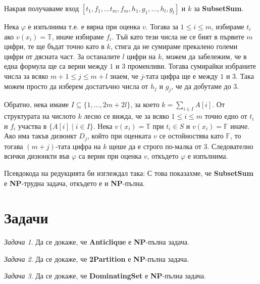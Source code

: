 \documentclass{article}
\newcommand{\T}{\mathbb{T}}
\newcommand{\F}{\mathbb{F}}
\newcommand{\NP}{\textbf{NP}}
\theoremstyle{definition}
\theoremstyle{plain}
\theoremstyle{remark}
\newtheorem{problem}{Задача}
\theoremstyle{definition}
\begin{document}
Накрая получаваме вход $[t_1, f_1, \dots t_m, f_m, h_1, g_1, \dots, h_l, g_l]$ и $k$ за \textbf{SubsetSum}.

Нека $\varphi$ е изпълнима т.е. е вярна при оценка $v$.
Тогава за $1 \leq i \leq m$, избираме $t_i$ ако $v(x_i) = \T$, иначе избираме $f_i$.
Тъй като тези числа не се бият в първите $m$ цифри, те ще бъдат точно като в $k$, стига да не сумираме прекалено големи цифри от дясната част.
За останалите $l$ цифри на $k$, можем да забележим, че в една формула ще са верни между $1$ и $3$ променливи.
Тогава сумирайки избраните числа за всяко $m + 1 \leq j \leq m + l$ знаем, че $j$-тата цифра ще е между $1$ и $3$.
Така можем просто да изберем достатъчно числа от $h_j$ и $g_j$, че да добутаме до $3$.

Обратно, нека имаме $I \subseteq \{ 1, \dots, 2m + 2l \}$, за което $k = \sum\limits_{i \in I} A[i]$.
От структурата на числото $k$ лесно се вижда, че за всяко $1 \leq i \leq m$ точно едно от $t_i$ и $f_i$ участва в $\{ A[i] \mid i \in I \}$.
Нека $v(x_i) = \T$ при $t_i \in S$ и $v(x_i) = \F$ иначе.
Ако има такъв дизюнкт $D_j$, който при оценката $v$ се остойностява като $\F$, то тогава $(m + j)$-тата цифра на $k$ щеше да е строго по-малка от $3$.
Следователно всички дизюнкти във $\varphi$ са верни при оценка $v$, откъдето $\varphi$ е изпълнима.

Псевдокода на редукцията би изглеждал така:
С това показахме, че \textbf{SubsetSum} е \NP-трудна задача, откъдето е и \NP-пълна.

\section*{Задачи}

\begin{problem}
Да се докаже, че \textbf{Anticlique} е \NP-пълна задача.
\end{problem}

\begin{problem}
Да се докаже, че \textbf{2Partition} е \NP-пълна задача.
\end{problem}

\begin{problem}
Да се докаже, че \textbf{DominatingSet} е \NP-пълна задача.
\end{problem}
\end{document}
